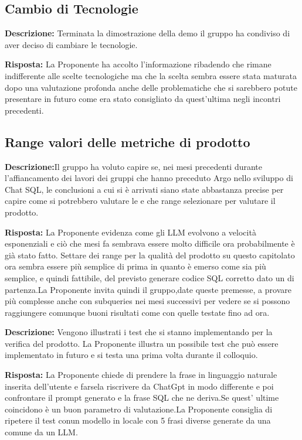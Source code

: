 \subsection{Cambio di Tecnologie}


\par \textbf{Descrizione:} Terminata la dimostrazione della demo il gruppo ha condiviso di aver deciso di cambiare le tecnologie.
\par \textbf{Risposta:} La Proponente ha accolto l'informazione ribadendo che rimane indifferente alle scelte tecnologiche ma che la scelta sembra essere stata maturata dopo una valutazione profonda anche delle problematiche che si sarebbero potute presentare in futuro come era stato consigliato da quest’ultima negli incontri precedenti.

\subsection{Range valori delle metriche di prodotto}

\par \textbf{Descrizione:}Il gruppo ha voluto capire se, nei mesi precedenti durante l’affiancamento dei lavori dei gruppi che hanno preceduto Argo nello sviluppo di Chat SQL, le conclusioni a cui si è arrivati siano state abbastanza precise per capire come si potrebbero valutare le  e che range selezionare per valutare il prodotto.
\par \textbf{Risposta:} La Proponente evidenza come gli LLM evolvono a velocità esponenziali e ciò che mesi fa sembrava essere molto difficile ora probabilmente è già stato fatto. Settare dei range per la qualità del prodotto su questo capitolato ora sembra essere più semplice di prima in quanto è emerso come sia più semplice, e quindi fattibile, del previsto generare codice SQL corretto dato un  di partenza.La Proponente invita quindi il gruppo,date queste premesse, a provare  più complesse anche con subqueries nei mesi successivi per vedere se si possono raggiungere comunque buoni risultati come con quelle testate fino ad ora.

\par \textbf{Descrizione:} Vengono illustrati i test che si stanno implementando per la verifica del prodotto. La Proponente illustra un possibile test che può essere implementato in futuro e si testa una prima volta durante il colloquio. 
\par \textbf{Risposta:} La Proponente chiede di prendere la frase in linguaggio naturale inserita dell'utente e farsela riscrivere da ChatGpt in modo differente e poi confrontare il prompt generato e la frase SQL che ne deriva.Se quest’ ultime coincidono è un buon parametro di valutazione.La Proponente consiglia di ripetere il test conun modello in locale con 5 frasi diverse generate da una comune da un LLM.
